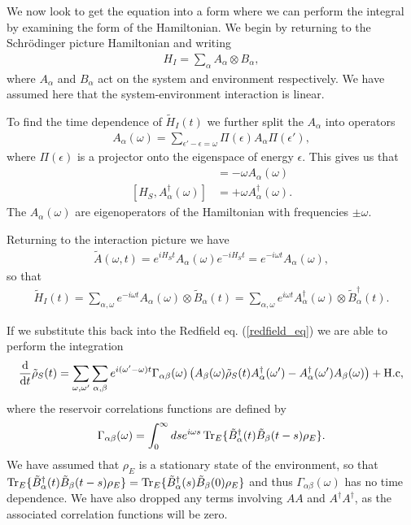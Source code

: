 We now look to get the equation into a form where we can perform the integral by examining the form of the Hamiltonian. We begin by returning to the Schr\"odinger picture Hamiltonian and writing
\begin{align}\label{AB_decomp}
  H_I = \sum_\alpha A_\alpha \otimes B_\alpha,
\end{align}
where $A_\alpha$ and $B_\alpha$ act on the system and environment respectively. We have assumed here that the system-environment interaction is linear.

To find the time dependence of $\tilde{H}_I(t)$ we further split the $A_\alpha$ into operators 
\begin{align}
  A_\alpha(\omega) = \sum_{\epsilon' - \epsilon = \omega} \Pi(\epsilon)A_\alpha \Pi(\epsilon'),
\end{align}
where $\Pi(\epsilon)$ is a projector onto the eigenspace of energy $\epsilon$. This gives us that
\begin{align}
  [H_S, A_\alpha(\omega)] &= - \omega A_\alpha(\omega) \\
  [H_S, A^\dagger_\alpha(\omega)] &= + \omega A^\dagger_\alpha(\omega).
\end{align}
The $A_\alpha(\omega)$ are eigenoperators of the Hamiltonian with frequencies $\pm \omega$.

Returning to the interaction picture we have
\begin{align}
  \tilde{A}(\omega, t) = e^{iH_S t}A_\alpha(\omega) e^{-iH_S t} = e^{-i\omega t} A_\alpha(\omega),
\end{align}
so that
\begin{align}
  \tilde{H}_I(t) = \sum_{\alpha, \omega} e^{-i \omega t} A_\alpha(\omega)\otimes \tilde{B}_\alpha(t) = \sum_{\alpha, \omega} e^{i \omega t} A^\dagger_\alpha(\omega)\otimes \tilde{B}^\dagger_\alpha(t).
\end{align}

If we substitute this back into the Redfield eq. (\ref{redfield_eq}) we are able to perform the integration
\begin{align}
  \label{me_before_rwa}
  \frac{\mathrm{d}}{\mathrm{d}t} \tilde{\rho}_S(t) = \sum_{\omega, \omega'} \sum_{\alpha, \beta} e^{i(\omega'-\omega)t} \Gamma_{\alpha\beta}(\omega)\left(A_\beta(\omega)\tilde{\rho}_S(t)A^\dagger_\alpha(\omega') - A^\dagger_\alpha(\omega')A_\beta(\omega)\right) + \text{H.c},
\end{align}
where the reservoir correlations functions are defined by
\begin{align}
  \Gamma_{\alpha\beta}(\omega) = \int_0^\infty ds e^{i\omega s} \operatorname{Tr}_E \{ \tilde{B}_\alpha^\dagger(t) \tilde{B}_\beta(t-s) \rho_E \}.
\end{align}
We have assumed that $\rho_E$ is a stationary state of the environment, so that $\operatorname{Tr}_E \{\tilde{B}_\alpha^\dagger(t) \tilde{B}_\beta(t-s) \rho_E \} = \operatorname{Tr}_E \{\tilde{B}_\alpha^\dagger(s) \tilde{B}_\beta(0) \rho_E \}$ and thus $\Gamma_{\alpha\beta}(\omega)$ has no time dependence. We have also dropped any terms involving $AA$ and $A^\dagger A^\dagger$, as the associated correlation functions will be zero.

